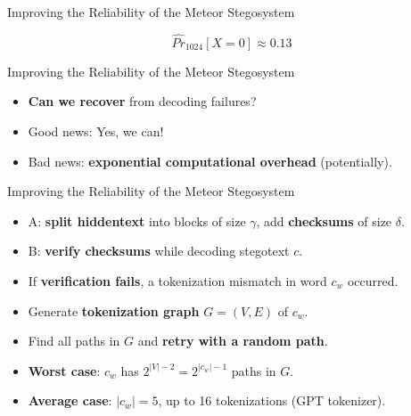 \documentclass[10pt]{beamer}
\begin{document}
\begin{frame}{Improving the Reliability of the Meteor Stegosystem}
	\centering
	
	$$\hat{Pr}_{1024}[X=0] \approx 0.13$$
\end{frame}

\begin{frame}{Improving the Reliability of the Meteor Stegosystem}
	\begin{itemize}[<+->]
		\item \textbf{Can we recover} from decoding failures? 
		\item Good news: Yes, we can!
		\item Bad news: \textbf{exponential computational overhead} (potentially).
	\end{itemize}
\end{frame}

\begin{frame}{Improving the Reliability of the Meteor Stegosystem}
	\begin{itemize}[<+->]
		\item A: \textbf{split hiddentext} into blocks of size $\gamma$, add \textbf{checksums} of size $\delta$.
		\item B: \textbf{verify checksums} while decoding stegotext $c$.
		\item If \textbf{verification fails}, a tokenization mismatch in word $c_w$ occurred.
		\item Generate \textbf{tokenization graph} $G=(V,E)$ of $c_w$.
		\item Find all paths in $G$ and \textbf{retry with a random path}.
		\item \textbf{Worst case}: $c_w$ has $2^{\left|V\right|-2} = 2^{|c_w|-1}$ paths in $G$.
		\item \textbf{Average case}: $|c_w| = 5$, up to 16 tokenizations (GPT tokenizer).
	\end{itemize}
\end{frame}
	
\end{document}
